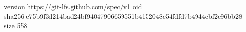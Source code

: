 version https://git-lfs.github.com/spec/v1
oid sha256:e75b9f3d214bad24bf94047906659551b4152048c54fdfd7b4944cbf2c96bb28
size 558
